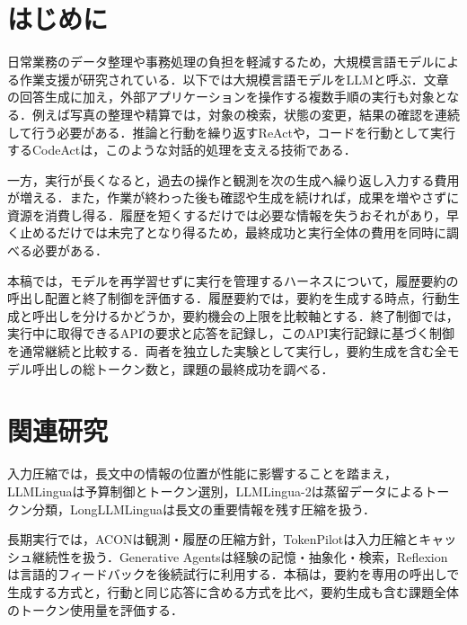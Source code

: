 \documentclass[letter]{ieicej}
\begin{document}
\maketitle



\section{はじめに}

日常業務のデータ整理や事務処理の負担を軽減するため，大規模言語モデルによる作業支援が研究されている．以下では大規模言語モデルをLLMと呼ぶ．文章の回答生成に加え，外部アプリケーションを操作する複数手順の実行も対象となる．例えば写真の整理や精算では，対象の検索，状態の変更，結果の確認を連続して行う必要がある．推論と行動を繰り返すReAct\cite{yao2023react}や，コードを行動として実行するCodeAct\cite{wang2024codeact}は，このような対話的処理を支える技術である．

一方，実行が長くなると，過去の操作と観測を次の生成へ繰り返し入力する費用が増える．また，作業が終わった後も確認や生成を続ければ，成果を増やさずに資源を消費し得る．履歴を短くするだけでは必要な情報を失うおそれがあり，早く止めるだけでは未完了となり得るため，最終成功と実行全体の費用を同時に調べる必要がある．

本稿では，モデルを再学習せずに実行を管理するハーネスについて，履歴要約の呼出し配置と終了制御を評価する．履歴要約では，要約を生成する時点，行動生成と呼出しを分けるかどうか，要約機会の上限を比較軸とする．終了制御では，実行中に取得できるAPIの要求と応答を記録し，このAPI実行記録に基づく制御を通常継続と比較する．両者を独立した実験として実行し，要約生成を含む全モデル呼出しの総トークン数と，課題の最終成功を調べる．

\par\noindent\begin{minipage}{\columnwidth}
\section{関連研究}

入力圧縮では，長文中の情報の位置が性能に影響すること\cite{liu2024lost}を踏まえ，LLMLingua\cite{jiang2023llmlingua}は予算制御とトークン選別，LLMLingua-2\cite{pan2024llmlingua2}は蒸留データによるトークン分類，LongLLMLingua\cite{jiang2024longllmlingua}は長文の重要情報を残す圧縮を扱う．

\end{minipage}\par{}

長期実行では，ACON\cite{kang2026acon}は観測・履歴の圧縮方針，TokenPilot\cite{xu2026tokenpilot}は入力圧縮とキャッシュ継続性を扱う．Generative Agents\cite{park2023generative}は経験の記憶・抽象化・検索，Reflexion\cite{shinn2023reflexion}は言語的フィードバックを後続試行に利用する．本稿は，要約を専用の呼出しで生成する方式と，行動と同じ応答に含める方式を比べ，要約生成も含む課題全体のトークン使用量を評価する．
\end{document}
